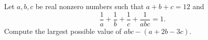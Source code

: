 Let $a,b,c$ be real nonzero numbers such that $a+b+c=12$ and \[\frac{1}{a}+\frac{1}{b}+\frac{1}{c}+\frac{1}{abc}=1.\] Compute the largest possible value of $abc-(a+2b-3c)$.
